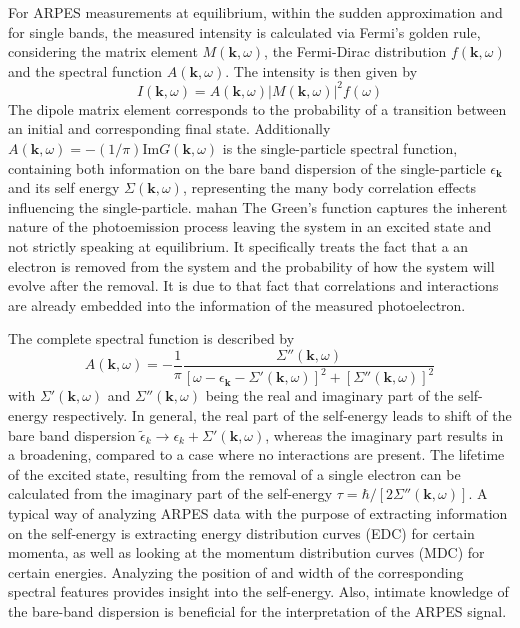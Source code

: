 For ARPES measurements at equilibrium, within the sudden approximation and for single bands, the measured intensity is calculated via Fermi's golden rule, considering the matrix element $M(\mathbf{k}, \omega)$, the Fermi-Dirac distribution $f(\mathbf{k}, \omega)$ and the spectral function $A(\mathbf{k}, \omega)$.
The intensity is then given by
\begin{equation}
	I(\mathbf{k}, \omega) = A(\mathbf{k}, \omega)\left|M(\mathbf{k}, \omega)\right|^2f(\omega)
	\label{eq:arpes_signal}
\end{equation}
The dipole matrix element corresponds to the probability of a transition between an initial and corresponding final state.
Additionally $A(\mathbf{k}, \omega)=-(1/\pi)\text{Im}G(\mathbf{k}, \omega)$ is the single-particle spectral function, containing both information on the bare band dispersion of the single-particle $\epsilon_\mathbf{k}$ and its self energy $\Sigma(\mathbf{k}, \omega)$, representing the many body correlation effects influencing the single-particle. \cite{} mahan
The Green's function captures the inherent nature of the photoemission process leaving the system in an excited state and not strictly speaking at equilibrium.
It specifically treats the fact that a an electron is removed from the system and the probability of how the system will evolve after the removal.
It is due to that fact that correlations and interactions are already embedded into the information of the measured photoelectron.

The complete spectral function is described by
\begin{equation}
	A(\mathbf{k}, \omega)= -\frac{1}{\pi} \frac{\Sigma''(\mathbf{k}, \omega)}{\left[ \omega - \epsilon_\mathbf{k} - \Sigma'(\mathbf{k}, \omega) \right]^2 + \left[ \Sigma''(\mathbf{k}, \omega) \right]^2}
\end{equation}
with $\Sigma'(\mathbf{k}, \omega)$ and $\Sigma''(\mathbf{k}, \omega)$ being the real and imaginary part of the self-energy respectively.
In general, the real part of the self-energy leads to shift of the bare band dispersion $\tilde{\epsilon}_k \rightarrow \epsilon_k + \Sigma'(\mathbf{k}, \omega)$, whereas the imaginary part results in a broadening, compared to a case where no interactions are present.
The lifetime of the excited state, resulting from the removal of a single electron can be calculated from the imaginary part of the self-energy $\tau=\hbar/\left[2\Sigma''(\mathbf{k}, \omega)\right]$.
A typical way of analyzing ARPES data with the purpose of extracting information on the self-energy is extracting energy distribution curves (EDC) for certain momenta, as well as looking at the momentum distribution curves (MDC) for certain energies.
Analyzing the position of and width of the corresponding spectral features provides insight into the self-energy.
Also, intimate knowledge of the bare-band dispersion is beneficial for the interpretation of the ARPES signal.

